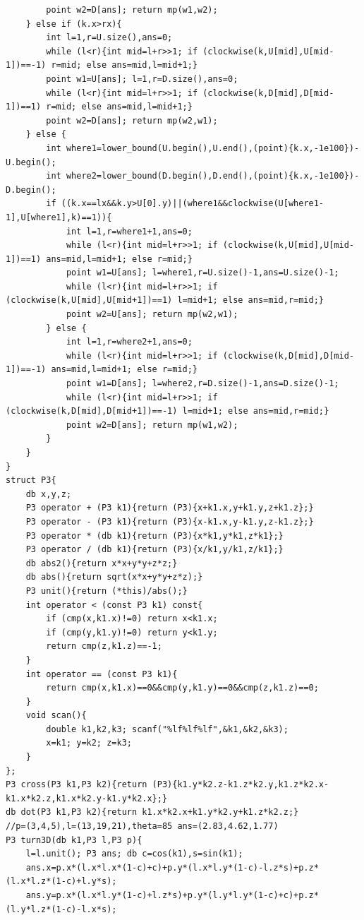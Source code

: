 \documentclass[twoside]{article}
\begin{document}
\begin{lstlisting}
        point w2=D[ans]; return mp(w1,w2);
    } else if (k.x>rx){
        int l=1,r=U.size(),ans=0;
        while (l<r){int mid=l+r>>1; if (clockwise(k,U[mid],U[mid-1])==-1) r=mid; else ans=mid,l=mid+1;}
        point w1=U[ans]; l=1,r=D.size(),ans=0;
        while (l<r){int mid=l+r>>1; if (clockwise(k,D[mid],D[mid-1])==1) r=mid; else ans=mid,l=mid+1;}
        point w2=D[ans]; return mp(w2,w1);
    } else {
        int where1=lower_bound(U.begin(),U.end(),(point){k.x,-1e100})-U.begin();
        int where2=lower_bound(D.begin(),D.end(),(point){k.x,-1e100})-D.begin();
        if ((k.x==lx&&k.y>U[0].y)||(where1&&clockwise(U[where1-1],U[where1],k)==1)){
            int l=1,r=where1+1,ans=0;
            while (l<r){int mid=l+r>>1; if (clockwise(k,U[mid],U[mid-1])==1) ans=mid,l=mid+1; else r=mid;}
            point w1=U[ans]; l=where1,r=U.size()-1,ans=U.size()-1;
            while (l<r){int mid=l+r>>1; if (clockwise(k,U[mid],U[mid+1])==1) l=mid+1; else ans=mid,r=mid;}
            point w2=U[ans]; return mp(w2,w1);
        } else {
            int l=1,r=where2+1,ans=0;
            while (l<r){int mid=l+r>>1; if (clockwise(k,D[mid],D[mid-1])==-1) ans=mid,l=mid+1; else r=mid;}
            point w1=D[ans]; l=where2,r=D.size()-1,ans=D.size()-1;
            while (l<r){int mid=l+r>>1; if (clockwise(k,D[mid],D[mid+1])==-1) l=mid+1; else ans=mid,r=mid;}
            point w2=D[ans]; return mp(w1,w2);
        }
    }
}
struct P3{
    db x,y,z;
    P3 operator + (P3 k1){return (P3){x+k1.x,y+k1.y,z+k1.z};}
    P3 operator - (P3 k1){return (P3){x-k1.x,y-k1.y,z-k1.z};}
    P3 operator * (db k1){return (P3){x*k1,y*k1,z*k1};}
    P3 operator / (db k1){return (P3){x/k1,y/k1,z/k1};}
    db abs2(){return x*x+y*y+z*z;}
    db abs(){return sqrt(x*x+y*y+z*z);}
    P3 unit(){return (*this)/abs();}
    int operator < (const P3 k1) const{
        if (cmp(x,k1.x)!=0) return x<k1.x;
        if (cmp(y,k1.y)!=0) return y<k1.y;
        return cmp(z,k1.z)==-1;
    }
    int operator == (const P3 k1){
        return cmp(x,k1.x)==0&&cmp(y,k1.y)==0&&cmp(z,k1.z)==0;
    }
    void scan(){
        double k1,k2,k3; scanf("%lf%lf%lf",&k1,&k2,&k3);
        x=k1; y=k2; z=k3;
    }
};
P3 cross(P3 k1,P3 k2){return (P3){k1.y*k2.z-k1.z*k2.y,k1.z*k2.x-k1.x*k2.z,k1.x*k2.y-k1.y*k2.x};}
db dot(P3 k1,P3 k2){return k1.x*k2.x+k1.y*k2.y+k1.z*k2.z;}
//p=(3,4,5),l=(13,19,21),theta=85 ans=(2.83,4.62,1.77)
P3 turn3D(db k1,P3 l,P3 p){
    l=l.unit(); P3 ans; db c=cos(k1),s=sin(k1);
    ans.x=p.x*(l.x*l.x*(1-c)+c)+p.y*(l.x*l.y*(1-c)-l.z*s)+p.z*(l.x*l.z*(1-c)+l.y*s);
    ans.y=p.x*(l.x*l.y*(1-c)+l.z*s)+p.y*(l.y*l.y*(1-c)+c)+p.z*(l.y*l.z*(1-c)-l.x*s);

\end{lstlisting}
\end{document}
